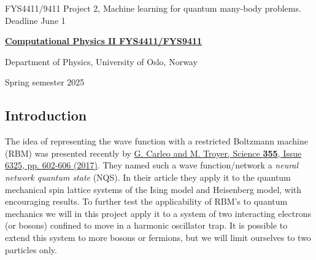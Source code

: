 \documentclass[%
oneside,                 %
final,                   %
10pt]{article}
\begin{document}

\newcommand{\exercisesection}[1]{\subsection*{#1}}






\thispagestyle{empty}

\begin{center}
{\LARGE\bf
\begin{spacing}{1.25}
FYS4411/9411 Project 2, Machine learning for  quantum many-body problems. Deadline June 1
\end{spacing}
}
\end{center}


\begin{center}
{\bf \href{{http://www.uio.no/studier/emner/matnat/fys/FYS4411/index-eng.html}}{Computational Physics II FYS4411/FYS9411}}
\end{center}

    \begin{center}
\centerline{{\small Department of Physics, University of Oslo, Norway}}
\end{center}
    

\begin{center}
Spring semester 2025
\end{center}

\vspace{1cm}


\subsection*{Introduction}

The idea of representing the wave function with
a restricted Boltzmann machine (RBM) was presented recently by \href{{http://science.sciencemag.org/content/355/6325/602}}{G. Carleo and M. Troyer, Science \textbf{355}, Issue 6325, pp. 602-606 (2017)}. They
named such a wave function/network a \textit{neural network quantum
state} (NQS). In their article they apply it to the quantum mechanical
spin lattice systems of the Ising model and Heisenberg model, with
encouraging results. To further test the applicability of RBM's to
quantum mechanics we will in this project apply it to a system of
two interacting electrons (or bosons)  confined to move in a harmonic oscillator trap.
It is possible to extend this system to more bosons or fermions, but we will limit ourselves to two particles only.
\end{document}
